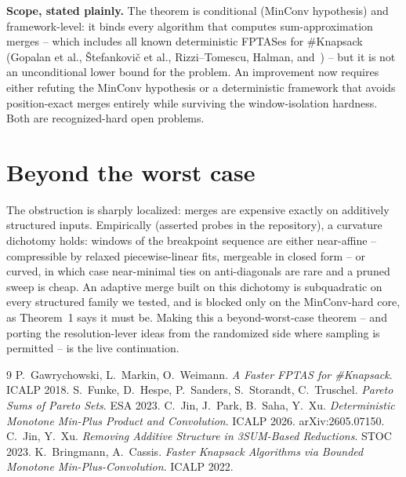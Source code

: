\documentclass[11pt]{article}
\begin{document}
\textbf{Scope, stated plainly.} The theorem is conditional (MinConv
hypothesis) and framework-level: it binds every algorithm that
computes sum-approximation merges -- which includes all known
deterministic FPTASes for \#Knapsack (Gopalan et al.,
\v{S}tefankovi\v{c} et al., Rizzi--Tomescu, Halman, and~\cite{GMW18})
-- but it is not an unconditional lower bound for the problem. An
improvement now requires either refuting the MinConv hypothesis or a
deterministic framework that avoids position-exact merges entirely
while surviving the window-isolation hardness. Both are
recognized-hard open problems.

\section{Beyond the worst case}

The obstruction is sharply localized: merges are expensive exactly on
additively structured inputs. Empirically (asserted probes in the
repository), a curvature dichotomy holds: windows of the breakpoint
sequence are either near-affine -- compressible by relaxed
piecewise-linear fits, mergeable in closed form -- or curved, in
which case near-minimal ties on anti-diagonals are rare and a pruned
sweep is cheap. An adaptive merge built on this dichotomy is
subquadratic on every structured family we tested, and is blocked
only on the MinConv-hard core, as Theorem~1 says it must be. Making
this a beyond-worst-case theorem -- and porting the resolution-lever
ideas from the randomized side where sampling is permitted -- is the
live continuation.

\begin{thebibliography}{9}
 P.~Gawrychowski, L.~Markin, O.~Weimann.
\emph{A Faster FPTAS for \#Knapsack}. ICALP 2018.
 S.~Funke, D.~Hespe, P.~Sanders, S.~Storandt,
C.~Truschel. \emph{Pareto Sums of Pareto Sets}. ESA 2023.
 C.~Jin, J.~Park, B.~Saha, Y.~Xu.
\emph{Deterministic Monotone Min-Plus Product and Convolution}.
ICALP 2026. arXiv:2605.07150.
 C.~Jin, Y.~Xu. \emph{Removing Additive Structure in
3SUM-Based Reductions}. STOC 2023.
 K.~Bringmann, A.~Cassis. \emph{Faster Knapsack
Algorithms via Bounded Monotone Min-Plus-Convolution}. ICALP 2022.
\end{thebibliography}
\end{document}
